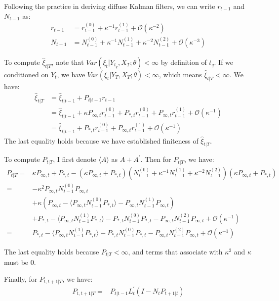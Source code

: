 \documentclass[10pt]{article}
\numberwithin{equation}{section}
\begin{document}
Following the practice in deriving diffuse Kalman filters, we can write $r_{t-1}$ and $N_{t-1}$ as: 
\begin{align*}
    r_{t-1} &= r_{t-1}^{(0)} + \kappa^{-1}r_{t-1}^{(1)} + \mathcal{O}(\kappa^{-2}) \\
    N_{t-1} &= N_{t-1}^{(0)} + \kappa^{-1}N_{t-1}^{(1)} + \kappa^{-2}N_{t-1}^{(2)} + \mathcal{O}(\kappa^{-3})
\end{align*}

To compute $\hat{\xi}_{t|T}$, note that $Var(\xi_t|Y_{t_q},X_T;\theta)<\infty$ by definition of $t_q$. If we conditioned on $Y_t$, we have $Var(\xi_t|Y_T,X_T;\theta)<\infty$, which means $\hat{\xi}_{t|T}<\infty$. We have:
\begin{align*}
    \hat{\xi}_{t|T} &= \hat{\xi}_{t|t-1} + P_{t|t-1}r_{t-1} \\
    &= \hat{\xi}_{t|t-1} + \kappa P_{\infty,t}r_{t-1}^{(0)}+P_{*,t}r_{t-1}^{(0)}+P_{\infty,t}r_{t-1}^{(1)}+\mathcal{O}(\kappa^{-1}) \\
    &= \hat{\xi}_{t|t-1} + P_{*,t}r_{t-1}^{(0)}+P_{\infty,t}r_{t-1}^{(1)}+\mathcal{O}(\kappa^{-1})
\end{align*}
The last equality holds because we have established finiteness of $\hat{\xi}_{t|T}$. 

To compute $P_{t|T}$, I first denote $\langle A\rangle$ as $A+A^{'}$. Then for $P_{t|T}$, we have:
\begin{align*}
    P_{t|T} =& \kappa P_{\infty,t} + P_{*,t} - (\kappa P_{\infty,t} + P_{*,t})(N_{t-1}^{(0)}+\kappa^{-1}N_{t-1}^{(1)}+ \kappa^{-2}N_{t-1}^{(2)})(\kappa P_{\infty,t} + P_{*,t}) \\
    =& -\kappa^2P_{\infty,t}N_{t-1}^{(0)}P_{\infty,t} \\
    &+ \kappa (P_{\infty,t} - \langle P_{\infty,t}N_{t-1}^{(0)}P_{*,t}\rangle - P_{\infty,t}N_{t-1}^{(1)}P_{\infty,t}) \\
    &+ P_{*,t} - \langle P_{\infty,t}N_{t-1}^{(1)}P_{*,t}\rangle - P_{*,t}N_{t-1}^{(0)}P_{*,t} 
        - P_{\infty,t}N_{t-1}^{(2)}P_{\infty,t} + \mathcal{O}(\kappa^{-1}) \\
    =& P_{*,t} - \langle P_{\infty,t}N_{t-1}^{(1)}P_{*,t}\rangle - P_{*,t}N_{t-1}^{(0)}P_{*,t} 
        - P_{\infty,t}N_{t-1}^{(2)}P_{\infty,t} + \mathcal{O}(\kappa^{-1}) 
\end{align*}

The last equality holds because  $P_{t|T}<\infty$, and terms that associate with $\kappa^{2}$ and $\kappa$ must be $0$.

Finally, for $P_{t,t+1|T}$, we have:
\begin{align*}
    P_{t,t+1|T} =& P_{t|t-1}L_t^{'}(I-N_tP_{t+1|t})
\end{align*}
\end{document}
